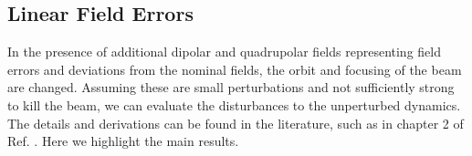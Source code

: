 \subsection{Linear Field Errors}

In the presence of additional dipolar and quadrupolar fields representing field errors and deviations from the nominal fields, the orbit and focusing of the beam are changed. Assuming these are small perturbations and not sufficiently strong to kill the beam, we can evaluate the disturbances to the unperturbed dynamics. The details and derivations can be found in the literature, such as in chapter 2 of Ref. \cite{lee_accelerator_2004}. Here we highlight the main results.
